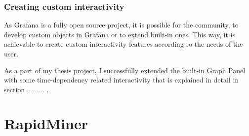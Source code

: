 \subsubsection{Creating custom interactivity}

As Grafana is a fully open source project, it is possible for the community, to develop custom objects in Grafana or to extend built-in ones. This way, it is achievable to create custom interactivity features according to the needs of the user.

As a part of my thesis project, I successfully extended the built-in Graph Panel with some time-dependency related interactivity that is explained in detail in section ......... .



\section{RapidMiner}


